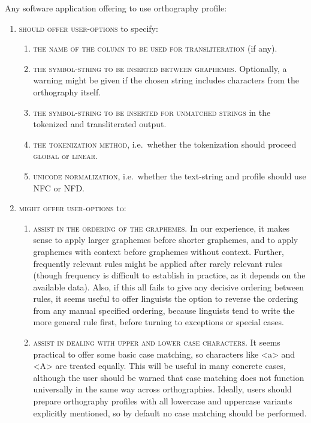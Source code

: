 Any software application offering to use orthography profile:

\begin{enumerate}
	\def\labelenumi{\arabic{enumi}.} 
	\item \textsc{should offer user-options} to specify:
	\begin{enumerate}
		\def\labelenumii{\arabic{enumii}.} 
		\item \textsc{the name of the column to be used for transliteration} (if any). 
		\item \textsc{the symbol-string to be inserted between graphemes.} Optionally, a warning might be given if the chosen string includes characters from the orthography itself. 
		\item \textsc{the symbol-string to be inserted for unmatched strings} in the tokenized and transliterated output. 
		\item \textsc{the tokenization method}, i.e.~whether the tokenization should proceed \textsc{global} or \textsc{linear}. 
		\item \textsc{unicode normalization}, i.e.~whether the text-string and profile should use \textsc{NFC} or \textsc{NFD}. 
	\end{enumerate}
	\item \textsc{might offer user-options }to:
	\begin{enumerate}
		\def\labelenumii{\arabic{enumii}.} \setcounter{enumii}{5} 
		\item \textsc{assist in the ordering of the graphemes.} In our experience, it makes sense to apply larger graphemes before shorter graphemes, and to apply graphemes with context before graphemes without context. Further, frequently relevant rules might be applied after rarely relevant rules (though frequency is difficult to establish in practice, as it depends on the available data). Also, if this all fails to give any decisive ordering between rules, it seems useful to offer linguists the option to reverse the ordering from any manual specified ordering, because linguists tend to write the more general rule first, before turning to exceptions or special cases. 
		\item \textsc{assist in dealing with upper and lower case characters.} It seems practical to offer some basic case matching, so characters like <a> and <A> are treated equally. This will be useful in many concrete cases, although the user should be warned that case matching does not function universally in the same way across orthographies. Ideally, users should prepare orthography profiles with all lowercase and uppercase variants explicitly mentioned, so by default no case matching should be performed. 

\end{enumerate}
\end{enumerate}
